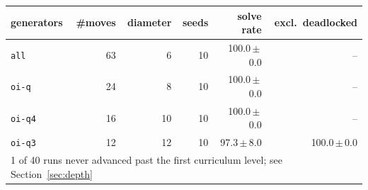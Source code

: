 \begin{tabular}{lrrrrr}
\toprule
generators & \#moves & diameter & seeds & solve rate & excl.\ deadlocked \\
\midrule
\texttt{all} & 63 & 6 & 10 & 100.0\,$\pm$\,0.0 & -- \\
\texttt{oi-q} & 24 & 8 & 10 & 100.0\,$\pm$\,0.0 & -- \\
\texttt{oi-q4} & 16 & 10 & 10 & 100.0\,$\pm$\,0.0 & -- \\
\texttt{oi-q3} & 12 & 12 & 10 & 97.3\,$\pm$\,8.0 & 100.0\,$\pm$\,0.0 \\
\midrule
\multicolumn{6}{l}{1 of 40 runs never advanced past the first curriculum level; see Section~\ref{sec:depth}} \\
\bottomrule
\end{tabular}